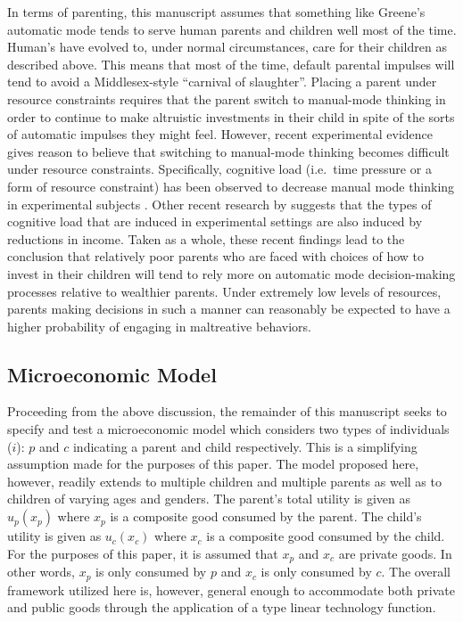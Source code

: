In terms of parenting, this manuscript assumes that something like Greene's automatic mode tends
to serve human parents and children well most of the time. Human's have evolved to, under
normal circumstances, care for their children as described above. This
means that most of the time, default parental impulses will tend to
avoid a Middlesex-style ``carnival of slaughter''. Placing a parent
under resource constraints requires that the parent switch to
manual-mode thinking in order to continue to make altruistic investments
in their child in spite of the sorts of automatic impulses they might
feel. However, recent experimental evidence gives reason to believe that
switching to manual-mode thinking becomes difficult under resource
constraints. Specifically, cognitive load (i.e.~time pressure or a form
of resource constraint) has been observed to decrease manual mode
thinking in experimental subjects \citep{Suter2011, Paxton2012}. Other recent research by \citet{Mani2013} suggests that the types of cognitive load that are
induced in experimental settings are also induced by reductions in
income. Taken as a whole, these recent findings lead to the conclusion
that relatively poor parents who are faced with choices of how to invest
in their children will tend to rely more on automatic mode
decision-making processes relative to wealthier parents. Under extremely
low levels of resources, parents making decisions in such a manner can
reasonably be expected to have a higher probability of engaging in
maltreative behaviors.

\subsection{Microeconomic Model}

Proceeding from the above discussion, the remainder of this manuscript seeks to specify and test a microeconomic model which considers two types of individuals ($i$): $p$ and $c$
indicating a parent and child respectively. This is a simplifying
assumption made for the purposes of this paper. The model proposed here,
however, readily extends to multiple children and multiple parents as
well as to children of varying ages and genders. The parent's total
utility is given as $u_p(x_p)$ where $x_p$ is a composite good
consumed by the parent. The child's utility is given as $u_c(x_c)$
where $x_c$ is a composite good consumed by the child. For the purposes
of this paper, it is assumed that $x_p$ and $x_c$ are private goods. In
other words, $x_p$ is only consumed by $p$ and $x_c$ is only consumed by
$c$. The overall framework utilized here is, however, general enough to
accommodate both private and public goods through the application of a \citet{Gorman1976} type linear technology function.

